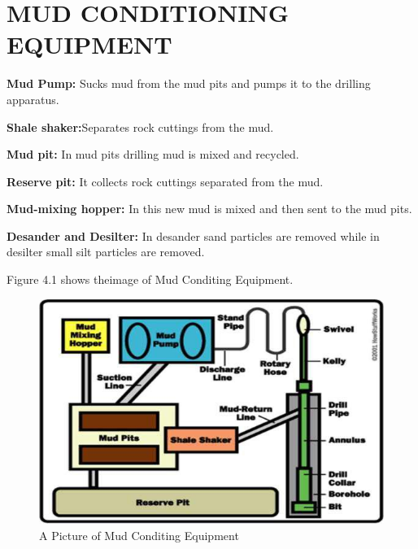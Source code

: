 \chapter{MUD CONDITIONING EQUIPMENT}


\textbf{Mud Pump:} Sucks mud from the mud pits and pumps it to the drilling apparatus.

\vspace{1em}

\noindent \textbf{Shale shaker:}Separates rock cuttings from the mud.

\vspace{1em}

\noindent \textbf{Mud pit:} In mud pits drilling mud is mixed and recycled. 

\vspace{1em}

\noindent \textbf{Reserve pit:} It collects rock cuttings separated from the mud.

\vspace{1em}

\noindent \textbf{Mud-mixing hopper:} In this new mud is mixed and then sent to the mud pits.

\vspace{1em}

\noindent \textbf{Desander and Desilter:} In desander sand particles are removed while in desilter small silt particles are removed.

\vspace{1em}

\noindent Figure 4.1 shows theimage of Mud Conditing Equipment.

\vspace{1em}

\begin{figure}[h]
\includegraphics[scale=0.6]{images/Mudconditingequipment}
\centering 
\caption{A Picture of Mud Conditing Equipment}
\end{figure}



